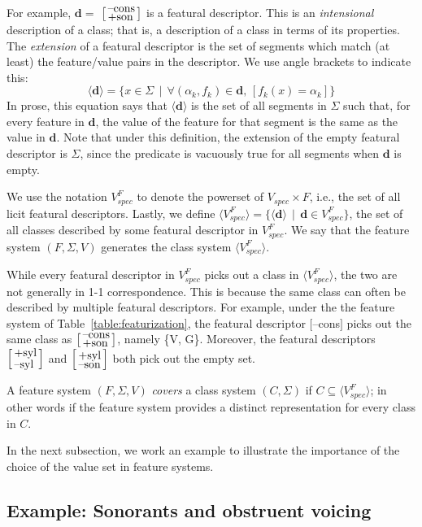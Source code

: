 \documentclass[12pt, oneside]{article}   	%
\newcommand{\featmat}[1]
{$[$#1$]$}
\newcommand{\featmattwo}[2]{$\begin{bsmallmatrix*}[l]\text{\normalsize #1}\\\text{\normalsize #2}\end{bsmallmatrix*}$}
\begin{document}
For example, $\mathbf{d} =$  \featmattwo{--cons}{+son} is a featural descriptor. This is an \textit{intensional} description of a class; that is, a description of a class in terms of its properties. The \textit{extension} of a featural descriptor is the set of segments which match (at least) the feature/value pairs in the descriptor. We use angle brackets to indicate this:
$$ \big \langle \mathbf{d} \big \rangle = \{x \in \Sigma \, \mid \, \forall (\alpha_k, f_k) \in \mathbf{d} \text{,  } [ f_k(x) = \alpha_k ] \} $$
In prose, this equation says that $\big \langle \mathbf{d} \big \rangle$ is the set of all segments in $\Sigma$ such that, for every feature in $\mathbf{d}$, the value of the feature for that segment is the same as the value in $\mathbf{d}$. Note that under this definition, the extension of the empty featural descriptor is $\Sigma$, since the predicate is vacuously true for all segments when $\mathbf{d}$ is empty. 

We use the notation $V_{spec}^F$ to denote the powerset of $V_{spec} \times F$, i.e., the set of all licit featural descriptors. Lastly, we define $\langle V_{spec}^F \rangle = \{ \langle \mathbf{d} \rangle \, \mid \, \mathbf{d} \in V_{spec}^F \}$, the set of all classes described by some featural descriptor in $V_{spec}^F$. We say that the feature system $(F, \Sigma, V)$ generates the class system $\langle V_{spec}^F \rangle$.

While every featural descriptor in $V_{spec}^F$ picks out a class in $\langle V_{spec}^F \rangle$, the two are not generally in 1-1 correspondence. This is because the same class can often be described by multiple featural descriptors. For example, under the the feature system of Table~\ref{table:featurization}, the featural descriptor \featmat{--cons} picks out the same class as \featmattwo{--cons}{+son}, namely \{V, G\}. Moreover, the featural descriptors \featmattwo{+syl}{--syl} and \featmattwo{+syl}{--son} both pick out the empty set.

A feature system $(F, \Sigma, V)$ \textit{covers} a class system $(C, \Sigma)$ if $C \subseteq \langle V_{spec}^F \rangle$; in other words if the feature system provides a distinct representation for every class in $C$. 

In the next subsection, we work an example to illustrate the importance of the choice of the value set in feature systems.

\subsection{Example: Sonorants and obstruent voicing}
\end{document}
